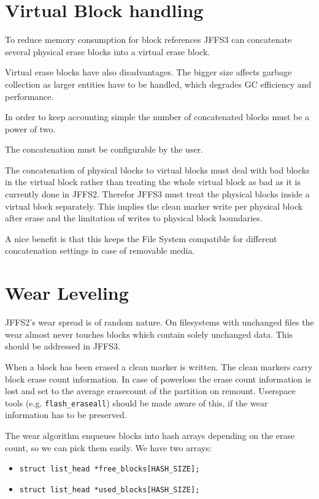 \documentclass[12pt,a4paper,oneside,titlepage]{article}
\begin{document}
\section{Virtual Block handling}
To reduce memory consumption for block references JFFS3 can
concatenate several physical erase blocks into a virtual erase block.

Virtual erase blocks have also disadvantages. The bigger size affects
garbage collection as larger entities have to be handled, which
degrades GC efficiency and performance.

In order to keep accounting simple the number of concatenated blocks
must be a power of two.

The concatenation must be configurable by the user.

The concatenation of physical blocks to virtual blocks must deal with
bad blocks in the virtual block rather than treating the whole virtual
block as bad as it is currently done in JFFS2. Therefor JFFS3 must treat the
physical blocks inside a virtual block separately. This implies the
clean marker write per physical block after erase and the limitation
of writes to physical block boundaries.

A nice benefit is that this keeps the File System compatible for different
concatenation settings in case of removable media.

%
%
\section{Wear Leveling}
JFFS2's wear spread is of random nature. On filesystems with
unchanged files the wear almost never touches blocks which contain
solely unchanged data. This should be addressed in JFFS3.

When a block has been erased a clean marker is written. The clean
markers carry block erase count information. In case of powerloss the
erase count information is lost and set to the average erasecount of
the partition on remount. Userspace tools (e.g. \texttt{flash\_eraseall})
should be made aware of this, if the wear information has to be preserved.

The wear algorithm enqueues blocks into hash arrays depending on the
erase count, so we can pick them easily. We have two arrays:

\begin{itemize}
\item \texttt{struct list\_head *free\_blocks[HASH\_SIZE];}
\item \texttt{struct list\_head *used\_blocks[HASH\_SIZE];}
\end{itemize}
\end{document}
